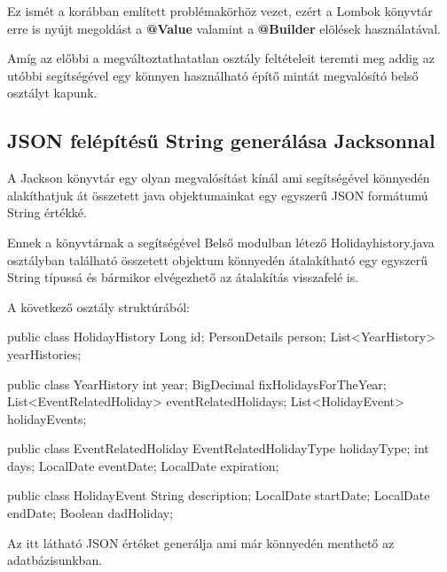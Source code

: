 \vskip 0.2in
Ez ismét a korábban említett problémakörhöz vezet, ezért a Lombok könyvtár erre is nyújt megoldást a \textbf{@Value} valamint a \textbf{@Builder} elölések használatával. 

Amíg az előbbi a megváltoztathatatlan osztály feltételeit teremti meg addig az utóbbi segítségével egy könnyen használható építő mintát megvalósító belső osztályt kapunk.

\subsection{JSON felépítésű String generálása Jacksonnal}

A Jackson könyvtár egy olyan megvalósítást kínál ami segítségével könnyedén alakíthatjuk át összetett java objektumainkat egy egyszerű JSON formátumú String értékké. 

Ennek a könyvtárnak a segítségével Belső modulban létező Holidayhistory.java osztályban található összetett objektum könnyedén átalakítható egy egyszerű String típussá és bármikor elvégezhető az átalakítás visszafelé is. 

A következő osztály struktúrából:
\begin{java}
public class HolidayHistory {	
	Long id;
	PersonDetails person;
	List<YearHistory> yearHistories;
}

public class YearHistory {
	int year;
	BigDecimal fixHolidaysForTheYear;
	List<EventRelatedHoliday> eventRelatedHolidays;
	List<HolidayEvent> holidayEvents;
}

public class EventRelatedHoliday {
	EventRelatedHolidayType holidayType;
	int days;
	LocalDate eventDate;
	LocalDate expiration;
}

public class HolidayEvent {
	String description;
	LocalDate startDate;
	LocalDate endDate;
	Boolean dadHoliday;
}
\end{java}

Az itt látható JSON értéket generálja ami már könnyedén menthető az adatbázisunkban.
\begin{java}
\end{java}

